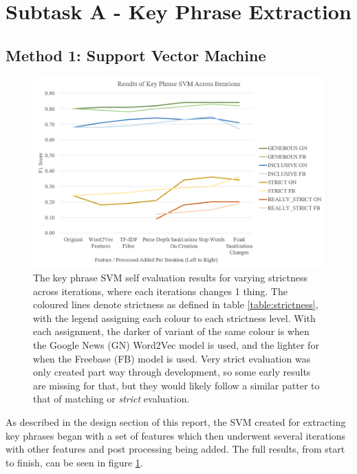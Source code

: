 \section{Subtask A - Key Phrase Extraction}

\subsection{Method 1: Support Vector Machine}

\begin{figure}
	\includegraphics[width=\textwidth]{img/kpsvmresults.png}
	\caption[Key Phrase SVM Self Evaluation Through Iterations]{The key phrase SVM self evaluation results for varying strictness across iterations, where each iterations changes 1 thing. The coloured lines denote strictness as defined in table \ref{table:strictness}, with the legend assigning each colour to each strictness level. With each assignment, the darker of variant of the same colour is when the Google News (GN) Word2Vec model is used, and the lighter for when the Freebase (FB) model is used. Very strict evaluation was only created part way through development, so some early results are missing for that, but they would likely follow a similar patter to that of matching or \textit{strict} evaluation.}
	\label{figure:kpsvmresults}
\end{figure}

As described in the design section of this report, the SVM created for extracting key phrases began with a set of features which then underwent several iterations with other features and post processing being added. The full results, from start to finish, can be seen in figure \ref{figure:kpsvmresults}.

